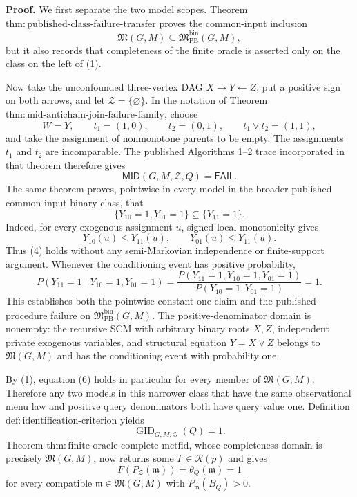 \textbf{Proof.}
We first separate the two model scopes.  Theorem \(\mathrm{thm:published\text{-}class\text{-}failure\text{-}transfer}\) proves the common-input inclusion
\[
 \mathfrak M(G,M)\subseteq
 \mathfrak M_{\mathrm{PB}}^{\mathrm{bin}}(G,M),
\tag{1}
\]
but it also records that completeness of the finite oracle is asserted only on the class on the left of (1).

Now take the unconfounded three-vertex DAG \(X\to Y\leftarrow Z\), put a positive sign on both arrows, and let \(\mathcal Z=\{\varnothing\}\).  In the notation of Theorem \(\mathrm{thm:mid\text{-}antichain\text{-}join\text{-}failure\text{-}family}\), choose
\[
 W=Y,
 \qquad
 t_1=(1,0),
 \qquad
 t_2=(0,1),
 \qquad
 t_1\vee t_2=(1,1),
\tag{2}
\]
and take the assignment of nonmonotone parents to be empty.  The assignments \(t_1\) and \(t_2\) are incomparable.  The published Algorithms 1--2 trace incorporated in that theorem therefore gives
\[
 \mathsf{MID}(G,M,\mathcal Z,Q)=\mathsf{FAIL}.
\tag{3}
\]
The same theorem proves, pointwise in every model in the broader published common-input binary class, that
\[
 \{Y_{10}=1,Y_{01}=1\}
 \subseteq
 \{Y_{11}=1\}.
\tag{4}
\]
Indeed, for every exogenous assignment \(u\), signed local monotonicity gives
\[
 Y_{10}(u)\le Y_{11}(u),
 \qquad
 Y_{01}(u)\le Y_{11}(u).
\tag{5}
\]
Thus (4) holds without any semi-Markovian independence or finite-support argument.  Whenever the conditioning event has positive probability,
\[
 P(Y_{11}=1\mid Y_{10}=1,Y_{01}=1)
 =\frac{P(Y_{11}=1,Y_{10}=1,Y_{01}=1)}
 {P(Y_{10}=1,Y_{01}=1)}
 =1.
\tag{6}
\]
This establishes both the pointwise constant-one claim and the published-procedure failure on \(\mathfrak M_{\mathrm{PB}}^{\mathrm{bin}}(G,M)\).  The positive-denominator domain is nonempty: the recursive SCM with arbitrary binary roots \(X,Z\), independent private exogenous variables, and structural equation \(Y=X\lor Z\) belongs to \(\mathfrak M(G,M)\) and has the conditioning event with probability one.

By (1), equation (6) holds in particular for every member of \(\mathfrak M(G,M)\).  Therefore any two models in this narrower class that have the same observational menu law and positive query denominators both have query value one.  Definition \(\mathrm{def:identification\text{-}criterion}\) yields
\[
 \operatorname{GID}_{G,M,\mathcal Z}(Q)=1.
\tag{7}
\]
Theorem \(\mathrm{thm:finite\text{-}oracle\text{-}complete\text{-}mctfid}\), whose completeness domain is precisely \(\mathfrak M(G,M)\), now returns some \(F\in\mathcal R(p)\) and gives
\[
 F(P_{\mathcal Z}(\mathfrak m))
 =\theta_Q(\mathfrak m)
 =1
\tag{8}
\]
for every compatible \(\mathfrak m\in\mathfrak M(G,M)\) with \(P_{\mathfrak m}(B_Q)>0\).

